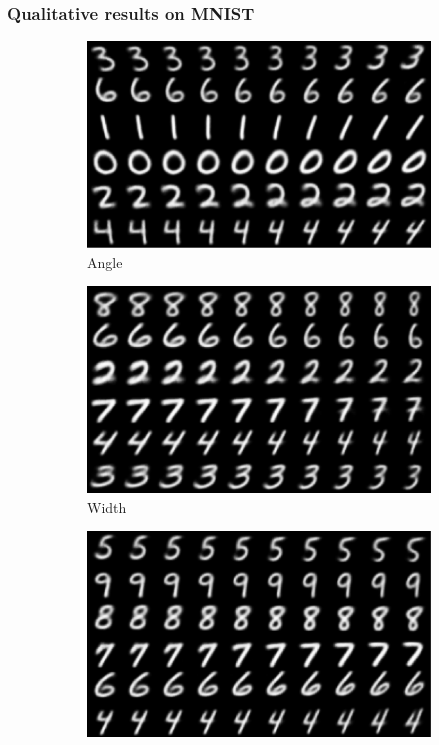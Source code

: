 \documentclass[10pt,mathserif]{beamer}
\begin{document}
\begin{frame}
\frametitle{Qualitative results on MNIST}
\begin{figure}[bp]
\centering
\begin{subfigure}[t]{0.48\linewidth}
\centering
\includegraphics[width=0.8\linewidth]{mnist_slant.png}
\caption{Angle}
\end{subfigure}\hspace{0.005\linewidth}
\begin{subfigure}[t]{0.48\linewidth}
\centering
\includegraphics[width=0.8\linewidth]{mnist_width.png}
\caption{Width}
\end{subfigure}\hspace{0.005\linewidth}
\begin{subfigure}[t]{0.48\linewidth}
\centering
\includegraphics[width=0.8\linewidth]{mnist_style.png}

\end{subfigure}
\end{figure}
\end{frame}
\end{document}
